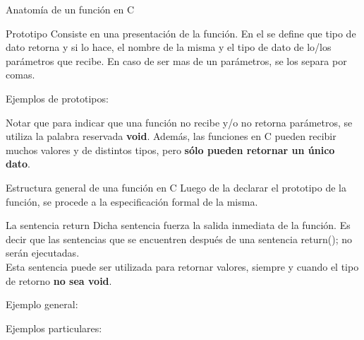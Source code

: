 \documentclass[xcolor=pdftex,table,11pt]{beamer}
\begin{document}
\begin{frame}[allowframebreaks]{Anatomía de un función en C}

\begin{block}{Prototipo}
Consiste en una presentación de la función. En el se define que tipo de dato retorna y si lo hace, el nombre de la misma y el tipo de dato de lo/los parámetros que recibe. En caso de ser mas de un parámetros, se los separa por comas.\\
\end{block}

Ejemplos de prototipos:
\codesetstylefrombeamer
{}


Notar que para indicar que una función no recibe y/o no retorna parámetros, se utiliza la palabra reservada \textbf{void}. Además, las funciones en C pueden recibir muchos valores y de distintos tipos, pero \textbf{sólo pueden retornar un único dato}.

\newpage

\begin{block}{Estructura general de una función en C}
Luego de la declarar el prototipo de la función, se procede a la especificación formal de la misma.
\end{block}





\begin{block}{La sentencia return}
Dicha sentencia fuerza la salida inmediata de la función. Es decir que las sentencias que se encuentren después de una sentencia return(); no serán ejecutadas.\\
Esta sentencia puede ser utilizada para retornar valores, siempre y cuando el tipo de retorno \textbf{no sea void}. 
\end{block}

\newpage
Ejemplo general:
\codesetstylefrombeamer
{}

Ejemplos particulares:







\end{frame}
\end{document}
